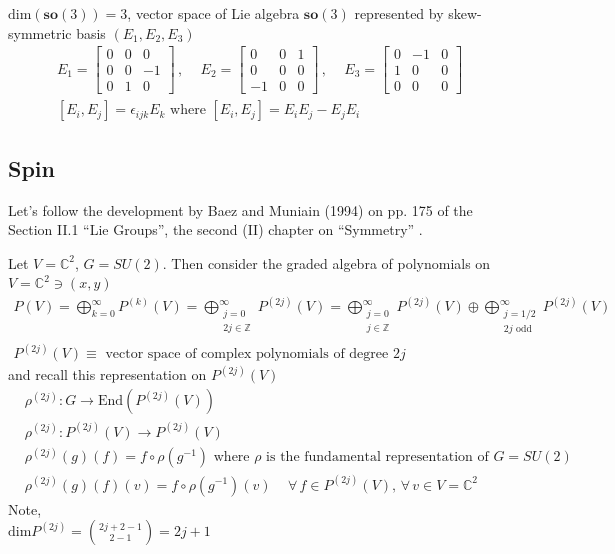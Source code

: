 \documentclass[10pt]{amsart}
\begin{document}
\begin{multicols*}{2}
$\text{dim}(\mathbf{so}(3)) = 3$, vector space of Lie algebra $\mathbf{so}(3)$ represented by skew-symmetric basis $(E_1, E_2, E_3)$
\[
\begin{gathered}
E_1 = \left[ \begin{matrix} 0 & 0 & 0 \\ 0 & 0 & -1 \\ 0 & 1 & 0 \end{matrix} \right] \, , \quad \, E_2 = \left[ \begin{matrix} 0 & 0 & 1 \\ 0 & 0 & 0 \\ -1 & 0 & 0 \end{matrix} \right] \, , \quad \, E_3 = \left[ \begin{matrix} 0 & -1 & 0 \\ 1 & 0 & 0 \\ 0 & 0 & 0 \end{matrix} \right] \\
[E_i , E_j ] =\epsilon_{ijk}E_k \text{ where } [E_i, E_j ] = E_i E_j - E_j E_i
\end{gathered} 
\]



\subsection{Spin}

Let's follow the development by Baez and Muniain (1994) on pp. 175 of the Section II.1 ``Lie Groups'', the second (II) chapter on ``Symmetry'' \cite{JBaezJMuniain1994}.  

Let $V = \mathbb{C}^2$, $G=SU(2)$.  Then consider the graded algebra of polynomials on $V = \mathbb{C}^2 \ni (x,y)$
\[
\begin{gathered}
P(V) = \bigoplus_{k=0}^{\infty} P^{(k)}(V) = \bigoplus_{ \substack{ j =0 \\ 2j \in \mathbb{Z}} }^{\infty} P^{(2j)}(V) = \bigoplus_{ \substack{ j=0 \\ j\in \mathbb{Z} }}^{\infty} P^{(2j)}(V) \oplus \bigoplus_{ \substack{ j=1/2 \\ 2j \text{ odd } } }^{\infty} P^{(2j)}(V) \\
P^{(2j)}(V) \equiv \text{ vector space of complex polynomials of degree $2j$ }
\end{gathered}
\]
and recall this representation on $P^{(2j)}(V)$
\[
\begin{aligned}
& \rho^{(2j)}:G \to \text{End}(P^{(2j)}(V)) \\ 
& \rho^{(2j)}: P^{(2j)}(V) \to P^{(2j)}(V) \\ 
& \rho^{(2j)}(g)(f) = f\circ \rho(g^{-1}) \text{ where $\rho$ is the fundamental representation of $G=SU(2)$ }\\
& \rho^{(2j)}(g)(f)(v) = f\circ \rho(g^{-1})(v) \quad \, \forall \, f \in P^{(2j)}(V), \, \forall \, v \in V = \mathbb{C}^2
\end{aligned}
\]
Note, \\
$\text{dim}P^{(2j)} = \binom{2j+2-1 }{2-1} = 2j+1$


\end{multicols*}
\end{document}

